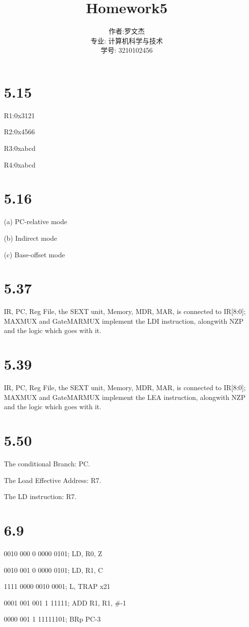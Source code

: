 \documentclass[20pt]{ctexart}
\title{Homework5}
\author{作者:罗文杰\\专业: 计算机科学与技术\\学号: 3210102456}
\date{}
\begin{document}
\maketitle

\section*{5.15}
R1:0x3121

R2:0x4566

R3:0xabcd

R4:0xabcd

\section*{5.16}
(a) PC-relative mode

(b) Indirect mode

(c) Base-offset mode

\section*{5.37}
IR, PC, Reg File, the SEXT unit, Memory, MDR, MAR, is connected to IR[8:0]; MAXMUX and GateMARMUX implement the LDI instruction, alongwith NZP and the logic which goes with it.

\section*{5.39}
IR, PC, Reg File, the SEXT unit, Memory, MDR, MAR, is connected to IR[8:0]; MAXMUX and GateMARMUX implement the LEA instruction, alongwith NZP and the logic which goes with it.

\section*{5.50}
The conditional Branch: PC.

The Load Effective Address: R7.

The LD instruction: R7.
\section*{6.9}
0010 000 0 0000 0101; LD, R0, Z 

0010 001 0 0000 0101; LD, R1, C 

1111 0000 0010 0001; L, TRAP x21 

0001 001 001 1 11111; ADD R1, R1, \#-1 

0000 001 1 11111101; BRp PC-3
\end{document}
